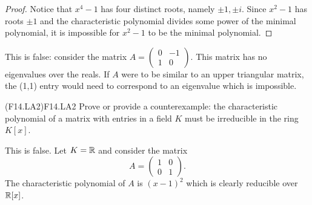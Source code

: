 \documentclass[../../AlgebraQualSolutions.tex]{subfiles}
\begin{document}
	\begin{proof}
		Notice that $x^4 - 1$ has four distinct roots, namely $\pm 1, \pm i$. Since $x^2 - 1$ has roots $\pm 1$ and the characteristic polynomial divides some power of the minimal polynomial, it is impossible for $x^2 -1$ to be the minimal polynomial.
	\end{proof}
	
	\begin{solution}
		This is false: consider the matrix $A = \begin{pmatrix} 0 & -1\\ 1 & 0\end{pmatrix}$. This matrix has no eigenvalues over the reals. If $A$ were to be similar to an upper triangular matrix, the (1,1) entry would need to correspond to an eigenvalue which is impossible.
	\end{solution}

\begin{prob}{(F14.LA2)}{F14.LA2}
	Prove or provide a counterexample: the characteristic polynomial of a matrix with entries in a field $K$ must be irreducible in the ring $K[x]$.
\end{prob}

\begin{solution}
	This is false. Let $K = \mathbb{R}$ and consider the matrix
		\[A = \begin{pmatrix} 1 & 0 \\ 0 & 1 \end{pmatrix}. \]
	The characteristic polynomial of $A$ is $(x-1)^2$ which is clearly reducible over $\mathbb{R}[x]$.
\end{solution}
\end{document}
